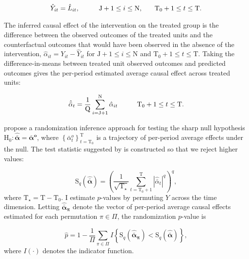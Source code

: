 \documentclass[hidelinks,12pt]{article}
\begin{document}
\begin{equation}
\hat{Y}_{it} = \hat{L}_{it}, \hspace{10mm} \text{J}+1 \leq i \leq \text{N}, \, \hspace{5mm} \,  \text{T}_0+1 \leq t \leq \text{T}.
\end{equation}
\noindent

The inferred causal effect of the intervention on the treated group is the difference between the observed outcomes of the treated units and the counterfactual outcomes that would have been observed in the absence of the intervention, 
$\hat{\alpha}_{it} = Y_{it} - \hat{Y}_{it}$ for $\text{J}+1 \leq i \leq \text{N}$ and $ \text{T}_0+1 \leq t \leq \text{T}.$ Taking the difference-in-means between treated unit observed outcomes and predicted outcomes gives the per-period estimated average causal effect across treated units:

\begin{equation}
\hat{\bar{\alpha}}_{t}  = \frac{1}{\text{Q}} \sum^{\text{N}}_{i=\text{J}+1} \hat{\alpha}_{it} \hspace{10mm}  \text{T}_0+1 \leq t \leq \text{T}.  \label{eq:avg-pointwise}
\end{equation}

\citet{chernozhukov2017exact} propose a randomization inference approach for testing the sharp null hypothesis $
\text{H}_0: \boldsymbol{\hat{\bar{\alpha}}} = \boldsymbol{\bar{\alpha}^{o}}$, where $\left\{\bar{\alpha}^{o}_{t}\right\}_{t= \text{T}_0}^\text{T}$ is a trajectory of per-period average effects under the null. The test statistic suggested by \citet{chernozhukov2017exact} is constructed so that we reject higher values:

\begin{equation} \label{tstat}
\text{S}_q (\boldsymbol{\hat{\bar{\alpha}}}) = \left(\frac{1}{\sqrt{\text{T}_\star}} \sum_{t= \text{T}_0 +1}^{\text{T}} |\hat{\bar{\alpha}}_{t}|^q\right)^q,
\end{equation}
%
where $\text{T}_\star = \text{T}- \text{T}_0$. I estimate $p$-values by permuting $Y$ across the time dimension. Letting $\boldsymbol{\hat{\bar{\alpha}}_{\pi}}$ denote the vector of per-period average causal effects estimated for each permutation $\pi \in \Pi$, the randomization $p$-value is

\begin{equation}
\hat{p} = 1 - \frac{1}{\Pi} \sum_{\pi \in \Pi} I \left\{\text{S}_q (\boldsymbol{\hat{\bar{\alpha}}_{\pi}}) < \text{S}_q (\boldsymbol{\hat{\bar{\alpha}}}) \right\}, \label{eq:pvalue}
\end{equation}
%
where $I (\cdot)$ denotes the indicator function. 
\end{document}
